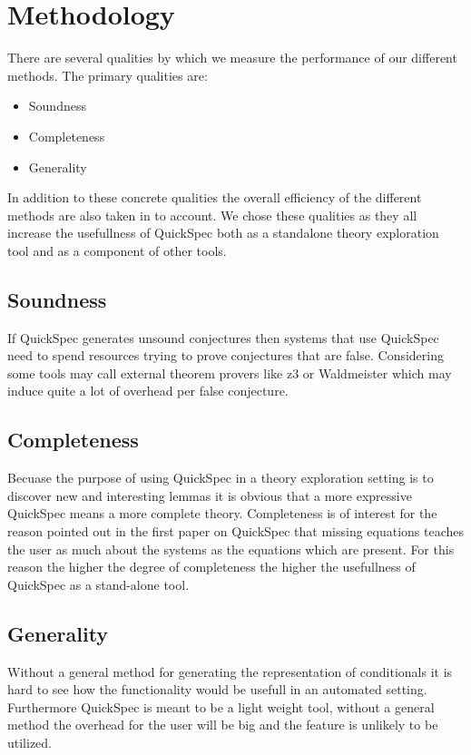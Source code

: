 \section{Methodology}
There are several qualities by which we measure the performance of our different methods.
The primary qualities are:

\begin{itemize}

    \item Soundness
    \item Completeness
    \item Generality

\end{itemize}

In addition to these concrete qualities the overall efficiency of the different methods are also
taken in to account.
We chose these qualities as they all increase the usefullness
of QuickSpec both as a standalone theory exploration tool
and as a component of other tools.

    \subsection{Soundness}
    If QuickSpec generates unsound conjectures then systems that use QuickSpec
    need to spend resources trying to prove conjectures that are false. 
    Considering some tools may call external theorem provers like z3 or Waldmeister %
    which may induce quite a lot of overhead per false conjecture.

    \subsection{Completeness}
    Becuase the purpose of using QuickSpec in a theory exploration setting is to discover
    new and interesting lemmas it is obvious that a more expressive QuickSpec means a more
    complete theory. %
    Completeness is of interest for the reason pointed out in the first paper on QuickSpec that %
    missing equations teaches the user as much about the systems as the equations which are
    present. For this reason the higher the degree of completeness the higher the usefullness
    of QuickSpec as a stand-alone tool. 

    \subsection{Generality}
    Without a general method for generating the representation of conditionals
    it is hard to see how the functionality would be usefull in an automated setting.
    Furthermore QuickSpec is meant to be a light weight tool, without a general method
    the overhead for the user will be big and the feature is unlikely to be utilized.
